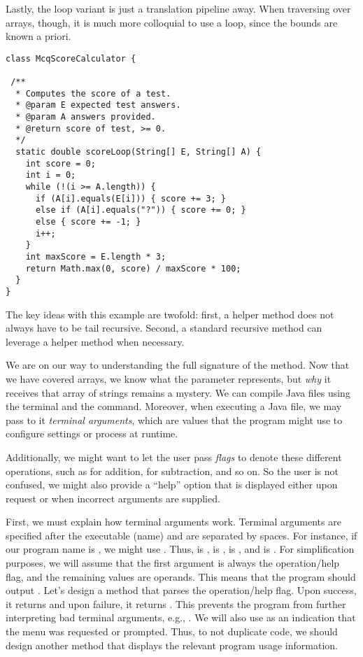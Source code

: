 Lastly, the loop variant is just a translation pipeline away. 
When traversing over arrays, though, it is much more colloquial to use a  loop, since the bounds are known a priori.

\begin{lstlisting}[language=MyJava]
class McqScoreCalculator {

 /**
  * Computes the score of a test.
  * @param E expected test answers.
  * @param A answers provided.
  * @return score of test, >= 0.
  */
  static double scoreLoop(String[] E, String[] A) {
    int score = 0;
    int i = 0;
    while (!(i >= A.length)) {
      if (A[i].equals(E[i])) { score += 3; } 
      else if (A[i].equals("?")) { score += 0; } 
      else { score += -1; }
      i++;
    }
    int maxScore = E.length * 3;
    return Math.max(0, score) / maxScore * 100;
  }
}
\end{lstlisting}

The key ideas with this example are twofold: first, a helper method does not always have to be tail recursive. 
Second, a standard recursive method can leverage a helper method when necessary.

We are on our way to understanding the full signature of the  method. 
Now that we have covered arrays, we know what the  parameter represents, but \emph{why} it receives that array of strings remains a mystery. 
We can compile Java files using the terminal and the  command. 
Moreover, when executing a Java file, we may pass to it \emph{terminal arguments}, which are values that the program might use to configure settings or process at runtime.

Additionally, we might want to let the user pass \emph{flags} to denote these different operations, such as  for addition,  for subtraction, and so on. 
So the user is not confused, we might also provide a ``help'' option that is displayed either upon request or when incorrect arguments are supplied.

First, we must explain how terminal arguments work. 
Terminal arguments are specified after the executable (name) and are separated by spaces. 
For instance, if our program name is , we might use . 
Thus,  is ,  is ,  is , and  is . 
For simplification purposes, we will assume that the first argument is always the operation/help flag, and the remaining values are operands. 
This means that the program should output . 
Let's design a method that parses the operation/help flag. 
Upon success, it returns  and upon failure, it returns . 
This prevents the program from further interpreting bad terminal arguments, e.g., . 
We will also use  as an indication that the  menu was requested or prompted. 
Thus, to not duplicate code, we should design another method that displays the relevant program usage information.

